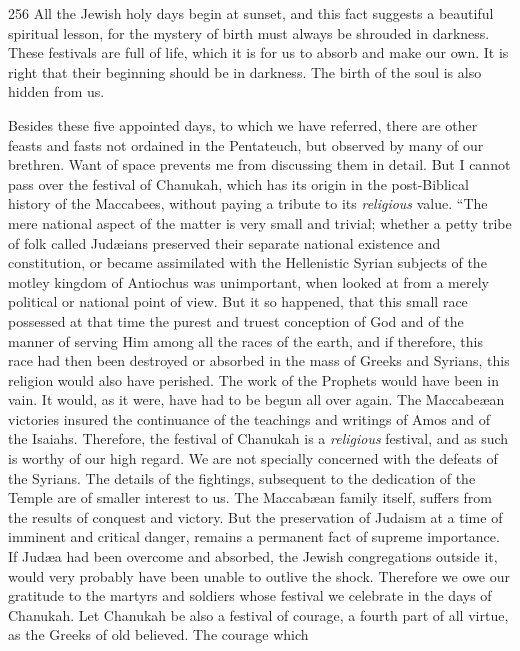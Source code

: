 \begin{tp}{256}
All the Jewish holy days begin at sunset,
and this fact suggests a beautiful spiritual
lesson, for the mystery of birth must always
be shrouded in darkness. These
festivals are full of life, which it is for
us to absorb and make our own. It is
right that their beginning should be in
darkness. The birth of the soul is also
hidden from us.
\end{tp}

Besides these five appointed days, to
which we have referred, there are other
feasts and fasts not ordained in the
Pentateuch, but observed by many of our
brethren. Want of space prevents me from
discussing them in detail. But I cannot
pass over the festival of Chanukah, which
has its origin in the post-Biblical history
of the Maccabees, without paying a tribute to
its \textsl{religious} value. “The mere national
aspect of the matter is very small and trivial;
whether a petty tribe of folk called Judæians
preserved their separate national existence
and constitution, or became assimilated with
the Hellenistic Syrian subjects of the motley
kingdom of Antiochus was unimportant,
when looked at from a merely political or
national point of view. But it so happened,
that this small race possessed at that time
the purest and truest conception of God and
of the manner of serving Him among all the
races of the earth, and if therefore, this race
had then been destroyed or absorbed in the
mass of Greeks and Syrians, this religion
would also have perished. The work of the
Prophets would have been in vain. It would,
as it were, have had to be begun all over
again. The Maccabeæan victories insured
the continuance of the teachings and writings
of Amos and of the Isaiahs. Therefore, the
festival of Chanukah is a \textsl{religious} festival,
and as such is worthy of our high regard. We
are not specially concerned with the defeats
of the Syrians. The details of the fightings,
subsequent to the dedication of the Temple
are of smaller interest to us. The Maccabæan
family itself, suffers from the results of
conquest and victory. But the preservation
of Judaism at a time of imminent and critical
danger, remains a permanent fact of supreme
importance. If Judæa had been overcome
and absorbed, the Jewish congregations
outside it, would very probably have been
unable to outlive the shock. Therefore we
owe our gratitude to the martyrs and soldiers
whose festival we celebrate in the days of
Chanukah. Let Chanukah be also a festival
of courage, a fourth part of all virtue, as the
Greeks of old believed. The courage which
